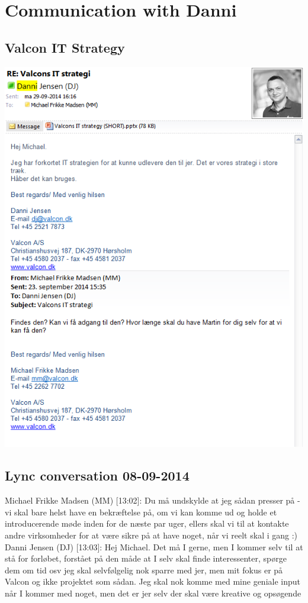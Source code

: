 \begin{linenumbers*}
\label{app:emails}
\section{Communication with Danni}

\subsection{Valcon IT Strategy}
\includegraphics[width=1.36\textwidth]{appendix/danni_communication_1}

\subsection{Lync conversation 08-09-2014}
Michael Frikke Madsen (MM) [13:02]: 
Du må undskylde at jeg sådan presser på - vi skal bare helst have en bekræftelse på, om vi kan komme ud og holde et introducerende møde inden for de næste par uger, ellers skal vi til at kontakte andre virksomheder for at være sikre på at have noget, når vi reelt skal i gang :) \newline
Danni Jensen (DJ) [13:03]: 
Hej Michael. Det må I gerne, men I kommer selv til at stå for forløbet, forstået på den måde at I selv skal finde interessenter, spørge dem om tid osv
jeg skal selvfølgelig nok sparre med jer, men mit fokus er på Valcon og ikke projektet som sådan. Jeg skal nok komme med mine geniale input når I kommer med noget, men det er jer selv der skal være kreative og opsøgende


\end{linenumbers*}
